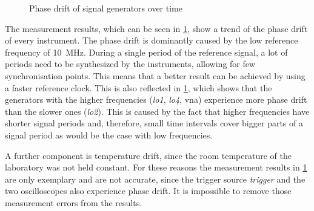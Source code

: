 \documentclass[12pt,a4paper,parskip=full,abstract=true,BCOR=12mm]{scrreprt}
\def\device#1{\mbox{\textit{#1}}}
\begin{document}
\begin{figure}[htb]
    \centering
    \caption{Phase drift of signal generators over time}
    \label{fig:phase_overall}
\end{figure}

The measurement results, which can be seen in \cref{fig:phase_overall}, show a
trend of the phase drift of every instrument. The phase drift is dominantly caused by
the low reference frequency of \SI{10}{\mega\hertz}. During a single period of the reference
signal, a lot of periods need to be synthesized by the instruments, allowing for few
synchronisation points. This means that a better result can be achieved by using a faster
reference clock. This is also reflected in \cref{fig:phase_overall}, which shows
that the generators with the higher frequencies (\device{lo1}, \device{lo4}, \gls{vna})
experience more phase drift than the slower ones (\device{lo2}). This
is caused by the fact that higher frequencies have shorter signal periods and, therefore,
small time intervals cover bigger parts of a signal period as would be the case with
low frequencies.

A further component is temperature drift, since the room temperature
of the laboratory was not held constant. For these reasons the measurement results in
\cref{fig:phase_overall} are only exemplary and are not accurate, since the trigger
source \device{trigger} and the two oscilloscopes also experience phase drift. It is
impossible to remove those measurement errors from the results.
\end{document}
